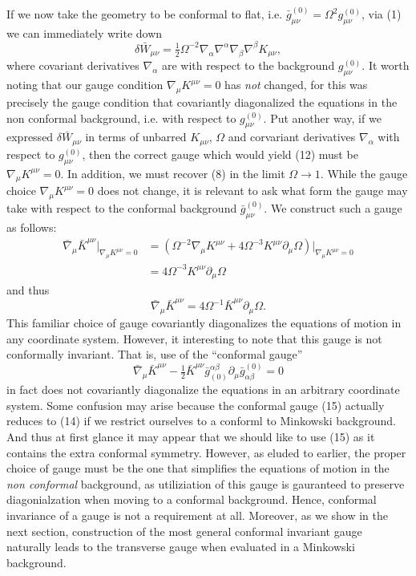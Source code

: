 \documentclass[10pt,letterpaper]{article}
\begin{document}
If we now take the geometry to be conformal to flat, i.e. $\bar g_{\mu\nu}^{(0)} = \Omega^2 g_{\mu\nu}^{(0)}$, via (1) we can immediately write down
\begin{equation} 
	 \delta \bar W_{\mu\nu} = \tfrac12 \Omega^{-2} \nabla_\alpha \nabla^\alpha \nabla_\beta \nabla^\beta K_{\mu\nu},
\end{equation}
where covariant derivatives $\nabla_\alpha$ are with respect to the background $g_{\mu\nu}^{(0)}$. It worth noting that our gauge condition $\nabla_\mu K^{\mu\nu} = 0$ has \emph{not} changed, for this was precisely the gauge condition that covariantly diagonalized the equations in the non conformal background, i.e. with respect to $g_{\mu\nu}^{(0)}$. Put another way, if we expressed $\delta \bar W_{\mu\nu}$ in terms of unbarred $K_{\mu\nu}$, $\Omega$ and corvariant  derivatives  $\nabla_\alpha$ with respect to $g_{\mu\nu}^{(0)}$, then the correct gauge which would yield (12) must be $\nabla_\mu K^{\mu\nu} = 0$. In addition, we must recover (8) in the limit $\Omega\to1$.  While the gauge choice $\nabla_\mu K^{\mu\nu}=0$ does not change, it is relevant to ask what form the gauge may take with respect to the conformal background $\bar g_{\mu\nu}^{(0)}$. We construct such a gauge as follows:
\begin{align}
	\bar \nabla_\mu \bar K^{\mu\nu}\big|_{\nabla_\mu K^{\mu\nu} = 0} &= (\Omega^{-2}\nabla_\mu K^{\mu\nu} + 4\Omega^{-3} K^{\mu\nu}\partial_\mu \Omega)\big|_{\nabla_\mu K^{\mu\nu} = 0}\nonumber \\
	&=4\Omega^{-3} K^{\mu\nu}\partial_\mu \Omega
\end{align}
and thus
\begin{equation}
	\bar \nabla_\mu \bar K^{\mu\nu}= 4\Omega^{-1} \bar K^{\mu\nu}\partial_\mu \Omega.
\end{equation}
 This familiar choice of gauge covariantly diagonalizes the equations of motion in any coordinate system. However, it interesting to note that this gauge is not conformally invariant. That is, use of the ``conformal gauge''
 \begin{equation}
  \bar \nabla_\mu \bar K^{\mu\nu}- \tfrac12 \bar K^{\mu\nu} \bar g_{(0)}^{\alpha\beta}\partial_\mu \bar g^{(0)}_{\alpha\beta}=0
 \end{equation}
 in fact does not covariantly diagonalize the equations in an arbitrary coordinate system. Some confusion may arise because the conformal gauge (15) actually reduces to (14) if we restrict ourselves to a conforml to Minkowski background. And thus at first glance it may appear that we should like to use (15) as it contains the extra conformal symmetry. However, as eluded to earlier, the proper choice of gauge must be the one that simplifies the equations of motion in the \emph{non conformal} background, as utiliziation of this gauge is gauranteed to preserve diagonialzation when moving to a conformal background. Hence, conformal invariance of a gauge is not a requirement at all. Moreover, as we show in the next section, construction of the most general conformal invariant gauge naturally leads to the transverse gauge when evaluated in a Minkowski background. 
\newpage
\end{document}
